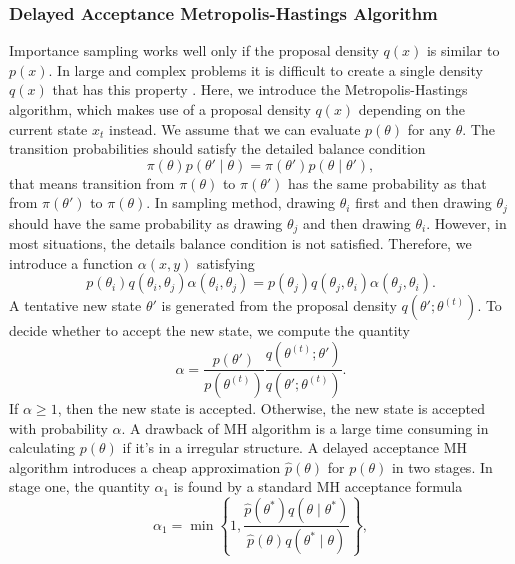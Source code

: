 \subsubsection{Delayed Acceptance Metropolis-Hastings Algorithm}

Importance sampling works well only if the proposal density $q(x)$ is similar to $p(x)$. In large and complex problems it is difficult to create a single density $q(x)$ that has this property \cite{mackay2003information}. Here, we introduce the Metropolis-Hastings algorithm, which makes use of a proposal density $q(x)$ depending on the current state $x_t$ instead. We assume that we can evaluate $p(\theta)$ for any $\theta$. The transition probabilities should satisfy the detailed balance condition
\begin{equation*}
\pi(\theta)p(\theta'\mid \theta) = \pi(\theta')p(\theta\mid \theta'),
\end{equation*}
that means transition from $\pi(\theta)$ to $\pi(\theta')$ has the same probability as that 
from $\pi(\theta')$ to $\pi(\theta)$. In sampling method, drawing $\theta_i$ first and then drawing $\theta_j$ should have the same probability as drawing $\theta_j$ and then drawing $\theta_i$. However, in most situations, the details balance condition is not satisfied. Therefore, we introduce a function $\alpha(x,y)$ satisfying 
\begin{equation*}
p(\theta_i)q(\theta_i, \theta_j)\alpha(\theta_i,\theta_j) = p(\theta_j)q(\theta_j, \theta_i)\alpha(\theta_j,\theta_i).
\end{equation*}
A tentative new state $\theta'$ is generated from the proposal density $q(\theta';\theta^{(t)})$. 
To decide whether to accept the new state, we compute the quantity
\begin{equation*}
\alpha=\frac{p(\theta')}{p(\theta^{(t)})}\frac{q(\theta^{(t)};\theta')}{q(\theta';\theta^{(t)})}.
\end{equation*}
If $\alpha \geq 1$, then the new state is accepted. Otherwise, the new state is accepted with probability $\alpha$. A drawback of MH algorithm is a large time consuming in calculating $p(\theta)$ if it's in a irregular structure. A delayed acceptance MH algorithm introduces a cheap approximation $\hat{p}(\theta)$ for $p(\theta)$ in two stages. In stage one, the quantity $\alpha_1$ is found by a standard MH acceptance formula 
\begin{equation}
\alpha_1=\min\left\lbrace  1,\frac{\hat{p}(\theta^*)q(\theta\mid \theta^*)}{\hat{p}(\theta)q(\theta^*\mid \theta)}  \right\rbrace ,
\end{equation}
